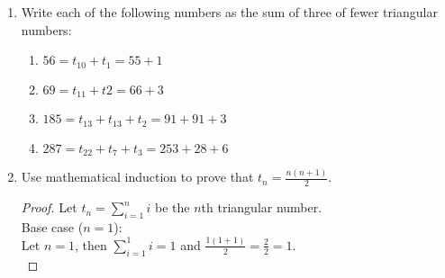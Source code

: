 \documentclass[11pt]{article}
\newenvironment{rcases}
                {\left.\begin{aligned}}
                {\end{aligned}\right\rbrace}
\begin{document}
\begin{enumerate}
\begin{enumerate}
\begin{proof}
            \[
            \begin{rcases}
                x=2n+1 \\
                y=2n^2+2n \\
                z=2n^2+2n+1
            \end{rcases}
            \]
            with $n \in \mathbb{Z}^{+}$. Then:
            \begin{align*}
                x^2+y^2 &= {(2n+1)}^2 + {2n^2+2n}^2 \\
                &= (4n^2+4n+1) + (4n^4+8n^3+4n^2) \\
                &= 4n^4+8n^3+8n^2+4n+1
            \end{align*}
            Also: 
            \begin{align*}
                z^2 &= {(2n^2+2n+1)}^2 \\
                &= 4n^4+8n^3+8n^2+4n+1
            \end{align*}
            Thus $x^2+y^2=z^2$ and (*) produces Pythagorean triples.
        \end{proof}
        \item Will (*) produce every primitive Pythagorean triple? Explain. \\
        No (*) will not generate every Pythagorean triple. It only generates Pythagorean triples 
        where $y$ and $z$ differ by $1$, and there are primitive Pythagorean triples where $y$ and $z$ 
        differ by more than 1, eg $(8, 15, 17)$.
    \end{enumerate}
    \item Write each of the following numbers as the sum of three of fewer triangular numbers:
    \begin{enumerate}
        \item $56 = t_{10}+t_{1}=55+1$
        \item $69 = t_{11}+t{2}=66+3$
        \item $185 = t_{13}+t_{13}+t_{2}=91+91+3$
        \item $287=t_{22}+t_{7}+t_{3}=253+28+6$
    \end{enumerate}
    \item Use mathematical induction to prove that $t_n = \displaystyle\frac{n(n+1)}{2}$.
    \begin{proof}
        Let $t_n = \sum\limits_{i=1}^{n}i$ be the $n$th triangular number. \\
        Base case ($n=1$): \\
        Let $n=1$, then $\sum\limits_{i=1}^{1}i = 1$ and $\displaystyle\frac{1(1+1)}{2}=\frac{2}{2}=1$. \\

\end{proof}
\end{enumerate}
\end{document}
